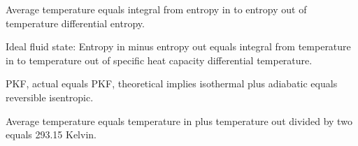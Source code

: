 Average temperature equals integral from entropy in to entropy out of temperature differential entropy.

Ideal fluid state: Entropy in minus entropy out equals integral from temperature in to temperature out of specific heat capacity differential temperature.

PKF, actual equals PKF, theoretical implies isothermal plus adiabatic equals reversible isentropic.

Average temperature equals temperature in plus temperature out divided by two equals 293.15 Kelvin.